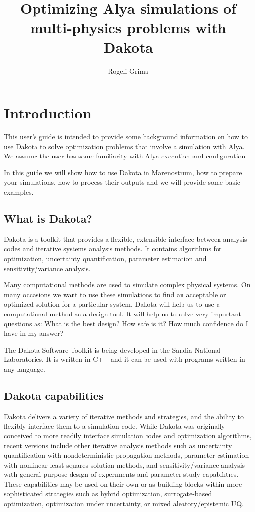 \documentclass[12pt,a4paper,article]{memoir} %
\title{Optimizing Alya simulations of multi-physics problems with Dakota}
\author{Rogeli Grima}
\begin{document}
\maketitle
\tableofcontents*

\chapter{Introduction}

This user's guide is intended to provide some background information on how to use Dakota to solve optimization problems that involve a simulation with Alya. We assume the user has some familiarity with Alya execution and configuration.

In this guide we will show how to use Dakota in Marenostrum, how to prepare your simulations, how to process their outputs and we will provide some basic examples.

\section{What is Dakota?}

Dakota is a toolkit that provides a flexible, extensible interface between analysis codes and iterative systems analysis methods. It contains algorithms for optimization, uncertainty quantification, parameter estimation and sensitivity/variance analysis.

Many computational methods are used to simulate complex physical systems. On many occasions we want to use these simulations to find an acceptable or optimized solution for a particular system. Dakota will help us to use a computational method as a design tool. It will help us to solve very important questions as: What is the best design? How safe is it? How much confidence do I have in my answer?

The Dakota Software Toolkit is being developed in the Sandia National Laboratories. It is written in C++ and it can be used with programs written in any language.

\section{Dakota capabilities}

Dakota delivers a variety of iterative methods and strategies, and the ability to flexibly interface them to a simulation code. While Dakota was originally conceived to more readily interface simulation codes and optimization algorithms, recent versions include other iterative analysis methods such as uncertainty quantification with nondeterministic propagation methods, parameter estimation with nonlinear least squares solution methods, and sensitivity/variance analysis with general-purpose design of experiments and parameter study capabilities. These capabilities may be used on their own or as building blocks within more sophisticated strategies such as hybrid optimization, surrogate-based optimization, optimization under uncertainty, or mixed aleatory/epistemic UQ.
\end{document}
